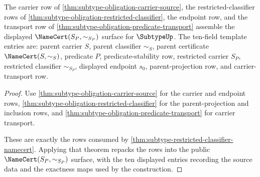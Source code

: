 \begin{theorem}
\label{thm:subtype-obligation-namecert-surface}
The carrier row of \autoref{thm:subtype-obligation-carrier-source}, the restricted-classifier rows of \autoref{thm:subtype-obligation-restricted-classifier}, the endpoint row, and the transport row of \autoref{thm:subtype-obligation-predicate-transport} assemble the displayed $\NameCert(S_P,\sim_{S_P})$ surface for $\SubtypeUp$. The ten-field template entries are: parent carrier $S$, parent classifier $\sim_S$, parent certificate $\NameCert(S,\sim_S)$, predicate $P$, predicate-stability row, restricted carrier $S_P$, restricted classifier $\sim_{S_P}$, displayed endpoint $s_0$, parent-projection row, and carrier-transport row.
\end{theorem}
\begin{proof}
Use \autoref{thm:subtype-obligation-carrier-source} for the carrier and endpoint rows, \autoref{thm:subtype-obligation-restricted-classifier} for the parent-projection and inclusion rows, and \autoref{thm:subtype-obligation-predicate-transport} for carrier transport.

These are exactly the rows consumed by \autoref{thm:subtype-restricted-classifier-namecert}. Applying that theorem repacks the rows into the public $\NameCert(S_P,\sim_{S_P})$ surface, with the ten displayed entries recording the source data and the exactness maps used by the construction.
\end{proof}

